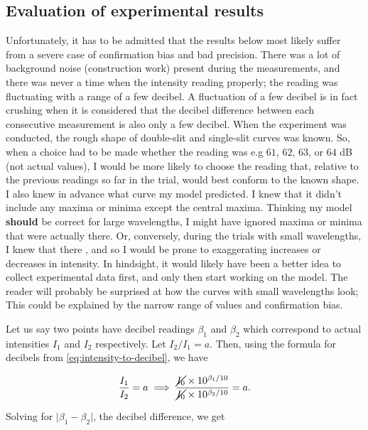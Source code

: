 \documentclass{paper}
\begin{document}
\subsection{Evaluation of experimental results}
\label{section:precision-and-bias}
Unfortunately, it has to be admitted that the results below most likely suffer from a severe case of confirmation bias and bad precision. There was a lot of background noise (construction work) present during the measurements, and there was never a time when the intensity reading  properly; the reading was fluctuating with a range of a few decibel. A fluctuation of a few decibel is in fact crushing when it is considered that the decibel difference between each consecutive measurement is also only a few decibel. When the experiment was conducted, the rough shape of double-slit and single-slit curves was known. So, when a choice had to be made whether the reading was e.g $61$, $62$, $63$, or $64$ dB (not actual values), I would be more likely to choose the reading that, relative to the previous readings so far in the trial, would best conform to the known shape. I also knew in advance what curve my model predicted. I knew that it didn't include any maxima or minima except the central maxima. Thinking my model \textbf{should} be correct for large wavelengths, I might have ignored maxima or minima that were actually there. Or, conversely, during the trials with small wavelengths, I knew that there , and so I would be prone to exaggerating increases or decreases in intensity. In hindsight, it would likely have been a better idea to collect experimental data first, and only then start working on the model. The reader will probably be surprised at how  the curves with small wavelengths look; This could be explained by the narrow range of values and confirmation bias.

Let us say two points have decibel readings $\beta_1$ and $\beta_2$ which correspond to actual intensities $I_1$ and $I_2$ respectively. Let $I_2 / I_1 = a$. Then, using the formula for decibels from \eqref{eq:intensity-to-decibel}, we have

\begin{equation*}
    \frac{I_1}{I_2} = a \implies \frac{\cancel{I_0} \times 10^{\beta_1 / 10}}{\cancel{I_0} \times 10^{\beta_2 / 10}} = a.
\end{equation*}

Solving for $\lvert \beta_1 - \beta_2\rvert$, the decibel difference, we get
\end{document}
